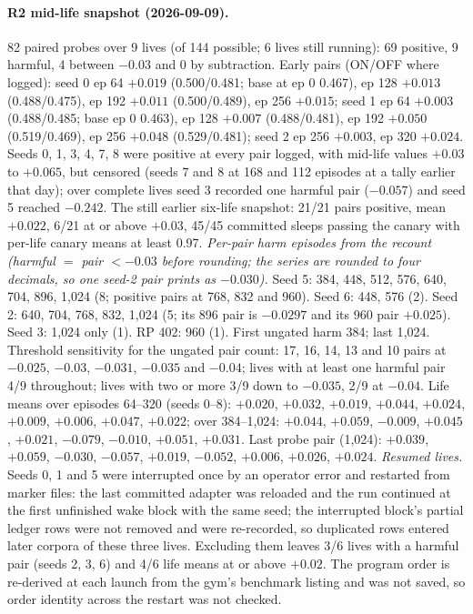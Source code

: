 \documentclass{article}
\begin{document}
\paragraph{R2 mid-life snapshot (2026-09-09).} 82 paired probes over 9 lives (of 144 possible; 6 lives still running): 69 positive, 9 harmful, 4 between $-0.03$ and 0 by subtraction. Early pairs (ON/OFF where logged): seed 0 ep 64 $+0.019$ (0.500/0.481; base at ep 0 0.467), ep 128 $+0.013$ (0.488/0.475), ep 192 $+0.011$ (0.500/0.489), ep 256 $+0.015$; seed 1 ep 64 $+0.003$ (0.488/0.485; base ep 0 0.463), ep 128 $+0.007$ (0.488/0.481), ep 192 $+0.050$ (0.519/0.469), ep 256 $+0.048$ (0.529/0.481); seed 2 ep 256 $+0.003$, ep 320 $+0.024$. Seeds 0, 1, 3, 4, 7, 8 were positive at every pair logged, with mid-life values $+0.03$ to $+0.065$, but censored (seeds 7 and 8 at 168 and 112 episodes at a tally earlier that day); over complete lives seed 3 recorded one harmful pair ($-0.057$) and seed 5 reached $-0.242$. The still earlier six-life snapshot: 21/21 pairs positive, mean $+0.022$, 6/21 at or above $+0.03$, 45/45 committed sleeps passing the canary with per-life canary means at least 0.97. \emph{Per-pair harm episodes from the recount (harmful $=$ pair $< -0.03$ before rounding; the series are rounded to four decimals, so one seed-2 pair prints as $-0.030$).} Seed 5: 384, 448, 512, 576, 640, 704, 896, 1{,}024 (8; positive pairs at 768, 832 and 960). Seed 6: 448, 576 (2). Seed 2: 640, 704, 768, 832, 1{,}024 (5; its 896 pair is $-0.0297$ and its 960 pair $+0.025$). Seed 3: 1{,}024 only (1). RP 402: 960 (1). First ungated harm 384; last 1{,}024. Threshold sensitivity for the ungated pair count: 17, 16, 14, 13 and 10 pairs at $-0.025$, $-0.03$, $-0.031$, $-0.035$ and $-0.04$; lives with at least one harmful pair 4/9 throughout; lives with two or more 3/9 down to $-0.035$, 2/9 at $-0.04$. Life means over episodes 64--320 (seeds 0--8): $+0.020$, $+0.032$, $+0.019$, $+0.044$, $+0.024$, $+0.009$, $+0.006$, $+0.047$, $+0.022$; over 384--1{,}024: $+0.044$, $+0.059$, $-0.009$, $+0.045$, $+0.021$, $-0.079$, $-0.010$, $+0.051$, $+0.031$. Last probe pair (1{,}024): $+0.039$, $+0.059$, $-0.030$, $-0.057$, $+0.019$, $-0.052$, $+0.006$, $+0.026$, $+0.024$. \emph{Resumed lives.} Seeds 0, 1 and 5 were interrupted once by an operator error and restarted from marker files: the last committed adapter was reloaded and the run continued at the first unfinished wake block with the same seed; the interrupted block's partial ledger rows were not removed and were re-recorded, so duplicated rows entered later corpora of these three lives. Excluding them leaves 3/6 lives with a harmful pair (seeds 2, 3, 6) and 4/6 life means at or above $+0.02$. The program order is re-derived at each launch from the gym's benchmark listing and was not saved, so order identity across the restart was not checked.
\end{document}
